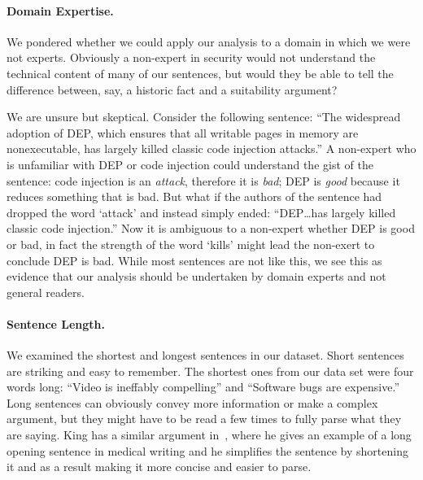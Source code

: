 \documentclass[sigconf,anonymous]{acmart}
\begin{document}
	
\paragraph{Domain Expertise.} We pondered whether we could apply our analysis to a domain in which we were not experts. Obviously a non-expert in security would not understand the technical content of many of our sentences, but would they be able to tell the difference between, say, a historic fact and a suitability argument? 

We are unsure but skeptical. Consider the following sentence: ``The widespread adoption of DEP, which ensures that all writable pages in memory are nonexecutable, has largely killed classic code injection attacks.'' A non-expert who is unfamiliar with DEP or code injection could understand the gist of the sentence: code injection is an \textit{attack}, therefore it is \textit{bad}; DEP is \textit{good} because it reduces something that is bad. But what if the authors of the sentence had dropped the word `attack' and instead simply ended: ``DEP\ldots has largely killed classic code injection.'' Now it is ambiguous to a non-expert whether DEP is good or bad, in fact the strength of the word `kills' might lead the non-exert to conclude DEP is bad. While most sentences are not like this, we see this as evidence that our analysis should be undertaken by domain experts and not general readers.

\paragraph{Sentence Length.} We examined the shortest and longest sentences in our dataset. Short sentences are striking and easy to remember. The shortest ones from our data set were four words long: ``Video is ineffably compelling'' and ``Software bugs are expensive.'' Long sentences can obviously convey more information or make a complex argument, but they might have to be read a few times to fully parse what they are saying. King has a similar argument in~\cite{king1967opening}, where he gives an example of a long opening sentence in medical writing and he simplifies the sentence by shortening it and as a result making it more concise and easier to parse. 
\end{document}
